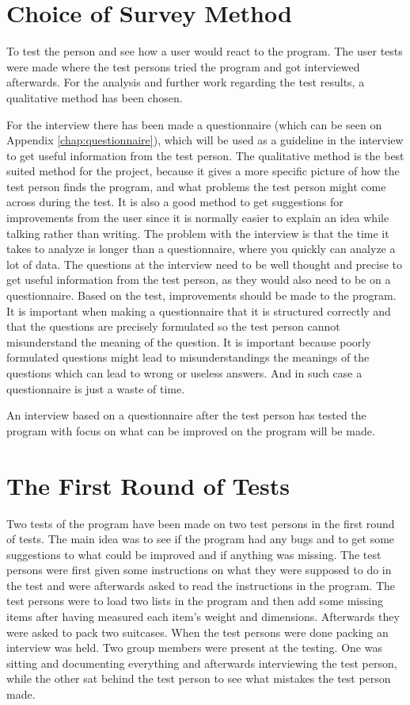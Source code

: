 \section{Choice of Survey Method}
To test the person and see how a user would react to the program. The user tests were made where the test persons tried the program and got interviewed afterwards. For the analysis and further work regarding the test results, a qualitative method has been chosen.

For the interview there has been made a questionnaire (which can be seen on Appendix \ref{chap:questionnaire}), which will be used as a guideline in the interview to get useful information from the test person. The qualitative method is the best suited method for the project, because it gives a more specific picture of how the test person finds the program, and what problems the test person might come across during the test. It is also a good method to get suggestions for improvements from the user since it is normally easier to explain an idea while talking rather than writing. The problem with the interview is that the time it takes to analyze is longer than a questionnaire, where you quickly can analyze a lot of data. The questions at the interview need to be well thought and precise to get useful information from the test person, as they would also need to be on a questionnaire. Based on the test, improvements should be made to the program.
It is important when making a questionnaire that it is structured correctly and that the questions are precisely formulated so the test person cannot misunderstand the meaning of the question. It is important because poorly formulated questions might lead to misunderstandings the meanings of the questions which can lead to wrong or useless answers. And in such case a questionnaire is  just a waste of time.

An interview based on a questionnaire after the test person has tested the program with focus on what can be improved on the program will be made.

\section{The First Round of Tests}
Two tests of the program have been made on two test persons in the first round of tests. The main idea was to see if the program had any bugs and to get some suggestions to what could be improved and if anything was missing. The test persons were first given some instructions on what they were supposed to do in the test and were afterwards asked to read the instructions in the program. The test persons were to load two lists in the program and then add some missing items after having measured each item's weight and dimensions. Afterwards they were asked to pack two suitcases. When the test persons were done packing an interview was held. Two group members were present at the testing. One was sitting and documenting everything and afterwards interviewing the test person, while the other sat behind the test person to see what mistakes the test person made.

